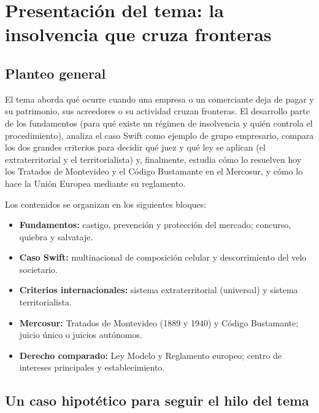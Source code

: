 \documentclass[12pt,oneside]{book}
\begin{document}

\chapter[Presentación del tema]{Presentación del tema: la insolvencia que cruza fronteras}

\section{Planteo general}

El tema aborda qué ocurre cuando una empresa o un comerciante deja de pagar y su patrimonio, sus acreedores o su actividad cruzan fronteras. El desarrollo parte de los fundamentos (para qué existe un régimen de insolvencia y quién controla el procedimiento), analiza el caso Swift como ejemplo de grupo empresario, compara los dos grandes criterios para decidir qué juez y qué ley se aplican (el extraterritorial y el territorialista) y, finalmente, estudia cómo lo resuelven hoy los Tratados de Montevideo y el Código Bustamante en el Mercosur, y cómo lo hace la Unión Europea mediante su reglamento.

Los contenidos se organizan en los siguientes bloques:

\begin{itemize}
    \item \textbf{Fundamentos:} castigo, prevención y protección del mercado; concurso, quiebra y salvataje.
    \item \textbf{Caso Swift:} multinacional de composición celular y descorrimiento del velo societario.
    \item \textbf{Criterios internacionales:} sistema extraterritorial (universal) y sistema territorialista.
    \item \textbf{Mercosur:} Tratados de Montevideo (1889 y 1940) y Código Bustamante; juicio único o juicios autónomos.
    \item \textbf{Derecho comparado:} Ley Modelo y Reglamento europeo; centro de intereses principales y establecimiento.
\end{itemize}

\section{Un caso hipotético para seguir el hilo del tema}
\end{document}
